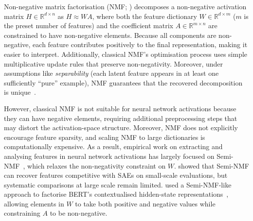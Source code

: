 Non-negative matrix factorisation (NMF; ) decomposes a non-negative activation matrix $H \in \mathbb{R}^{d \times n}$ as $H \approx WA$, where both the feature dictionary $W \in \mathbb{R}^{d \times m}$ ($m$ is the preset number of features) and the coefficient matrix $A \in \mathbb{R}^{m \times n}$ are constrained to have non-negative elements. Because all components are non-negative, each feature contributes positively to the final representation, making it easier to interpret. Additionally, classical NMF’s optimisation process uses simple multiplicative update rules that preserve non-negativity. Moreover, under assumptions like \emph{separability} (each latent feature appears in at least one sufficiently ``pure'' example), NMF guarantees that the recovered decomposition is unique~.

However, classical NMF is not suitable for neural network activations because they can have negative elements, requiring additional preprocessing steps that may distort the activation-space structure. Moreover, NMF does not explicitly encourage feature sparsity, and scaling NMF to large dictionaries is computationally expensive. As a result, empirical work on extracting and analysing features in neural network activations has largely focused on Semi-NMF~, which relaxes the non-negativity constraint on $W$.  showed that Semi-NMF can recover features competitive with SAEs on small-scale evaluations, but systematic comparisons at large scale remain limited.  used a Semi-NMF-like approach to factorise BERT's contextualised hidden-state representations~, allowing elements in $W$ to take both positive and negative values while constraining $A$ to be non-negative.



